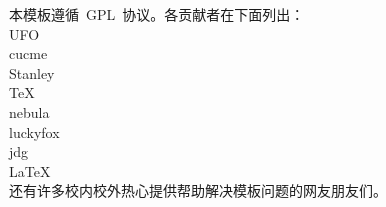 

本模板遵循~GPL~协议。各贡献者在下面列出：\\
UFO\\
cucme\\
Stanley\\
TeX\\
nebula\\
luckyfox\\
jdg\\
LaTeX\\
还有许多校内校外热心提供帮助解决模板问题的网友朋友们。
